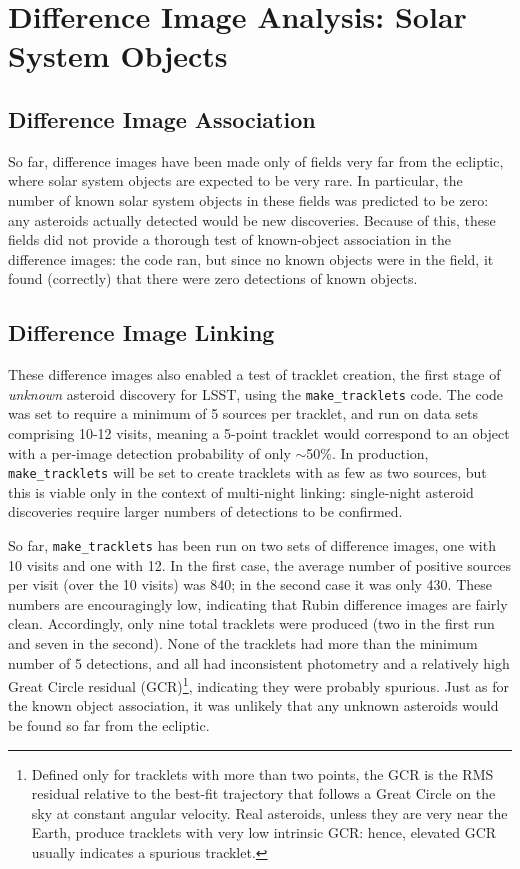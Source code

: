 \usepackage{graphicx}
\section{Difference Image Analysis: Solar System Objects}
\label{sec:dia_solar_system}

\subsection{Difference Image Association}
\label{sec:dia_solar_system_assoc}

So far, difference images have been made only of fields very far from the ecliptic, where solar system objects are expected to be very rare. In particular, the number of known solar system objects in these fields was predicted to be zero: any asteroids actually detected would be new discoveries. Because of this, these fields did not provide a thorough test of known-object association in the difference images: the code ran, but since no known objects were in the field, it found (correctly) that there were zero detections of known objects.

\subsection{Difference Image Linking}
\label{sec:dia_solar_system_link}

These difference images also enabled a test of tracklet creation, the first stage of {\em unknown} asteroid discovery for LSST, using the {\tt make\_tracklets} code. The code was set to require a minimum of 5 sources per tracklet, and run on data sets comprising 10-12 visits, meaning a 5-point tracklet would correspond to an object with a per-image detection probability of only $\sim$50\%. In production, {\tt make\_tracklets} will be set to create tracklets with as few as two sources, but this is viable only in the context of multi-night linking: single-night asteroid discoveries require larger numbers of detections to be confirmed.

So far, {\tt make\_tracklets} has been run on two sets of difference images, one with 10 visits and one with 12.  In the first case, the average number of positive sources per visit (over the 10 visits) was 840; in the second case it was only 430. These numbers are encouragingly low, indicating that Rubin difference images are fairly clean. Accordingly, only nine total tracklets were produced (two in the first run and seven in the second). None of the tracklets had more than the minimum number of 5 detections, and all had inconsistent photometry and a relatively high Great Circle residual (GCR)\footnote{Defined only for tracklets with more than two points, the GCR is the RMS residual relative to the best-fit trajectory that follows a Great Circle on the sky at constant angular velocity. Real asteroids, unless they are very near the Earth, produce tracklets with very low intrinsic GCR: hence, elevated GCR usually indicates a spurious tracklet.}, indicating they were probably spurious. Just as for the known object association, it was unlikely that any unknown asteroids would be found so far from the ecliptic.

